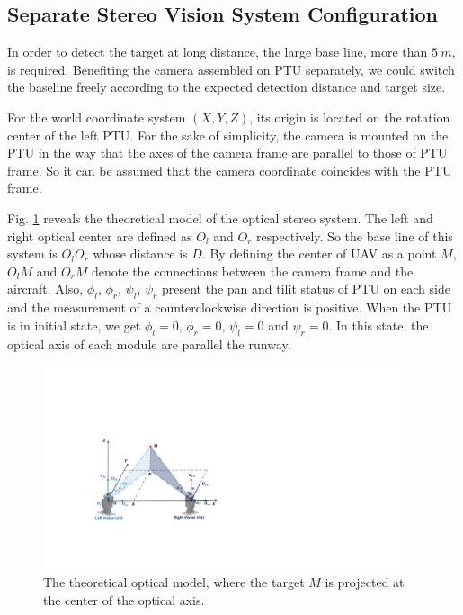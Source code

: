 \subsection{Separate Stereo Vision System Configuration}
In order to detect the target at long distance, the large base line, more than $5\ m $, is required. Benefiting the camera assembled on PTU separately, we could switch the baseline freely according to the expected detection distance and target size.

For the world coordinate system $(X, Y, Z)$, its origin is located on the rotation center of the left PTU. For the sake of simplicity, the camera is mounted on the PTU in the way that the axes of the camera frame are parallel to those of PTU frame. So it can be assumed that the camera coordinate coincides with the PTU frame. 

Fig. \ref{fig:TheoreticalModel} reveals the theoretical model of the optical stereo system. The left and right optical center are defined as ${O_l}$ and ${O_r}$ respectively. So the base line of this system is $O_lO_r$ whose distance is ${D}$. By defining the center of UAV as a point $M$, ${O_lM}$ and ${O_rM}$ denote the connections between the camera frame and the aircraft. Also, ${\phi_l}$, ${\phi_r}$, ${\psi_l}$, ${\psi_r}$ present the pan and tilit status of PTU on each side and the measurement of a counterclockwise direction is positive. When the PTU is in initial state, we get $\phi_l= 0$, $\phi_r=0$, ${\psi_l=0}$ and ${\psi_r=0}$. In this state, the optical axis of each module are parallel the runway.  
 

\begin{figure}[!tb]
	\centering
	\includegraphics[height=6cm]{figs/Fig03_Stereo.pdf}	
	\caption{The theoretical optical model, where the target $M$ is projected at the center of the optical axis.}
	\label{fig:TheoreticalModel}
\end{figure}

